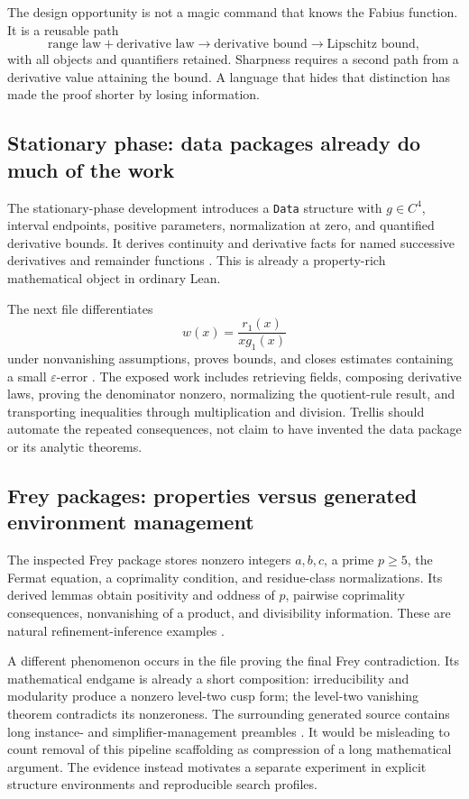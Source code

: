 \documentclass[11pt,a4paper]{article}
\theoremstyle{definition}
\theoremstyle{remark}
\newcommand{\code}[1]{\texttt{#1}}
\begin{document}
The design opportunity is not a magic command that knows the Fabius function. It is a reusable path
\[
 \text{range law} + \text{derivative law}
 \longrightarrow \text{derivative bound}
 \longrightarrow \text{Lipschitz bound},
\]
with all objects and quantifiers retained. Sharpness requires a second path from a derivative value attaining the bound. A language that hides that distinction has made the proof shorter by losing information.

\subsection{Stationary phase: data packages already do much of the work}
The stationary-phase development introduces a \code{Data} structure with $g\in C^4$, interval endpoints, positive parameters, normalization at zero, and quantified derivative bounds. It derives continuity and derivative facts for named successive derivatives and remainder functions \cite{spTaylor}. This is already a property-rich mathematical object in ordinary Lean.

The next file differentiates
\[
 w(x)=\frac{r_1(x)}{xg_1(x)}
\]
under nonvanishing assumptions, proves bounds, and closes estimates containing a small $\varepsilon$-error \cite{spParts}. The exposed work includes retrieving fields, composing derivative laws, proving the denominator nonzero, normalizing the quotient-rule result, and transporting inequalities through multiplication and division. Trellis should automate the repeated consequences, not claim to have invented the data package or its analytic theorems.

\subsection{Frey packages: properties versus generated environment management}
The inspected Frey package stores nonzero integers $a,b,c$, a prime $p\ge5$, the Fermat equation, a coprimality condition, and residue-class normalizations. Its derived lemmas obtain positivity and oddness of $p$, pairwise coprimality consequences, nonvanishing of a product, and divisibility information. These are natural refinement-inference examples \cite{freyDef}.

A different phenomenon occurs in the file proving the final Frey contradiction. Its mathematical endgame is already a short composition: irreducibility and modularity produce a nonzero level-two cusp form; the level-two vanishing theorem contradicts its nonzeroness. The surrounding generated source contains long instance- and simplifier-management preambles \cite{freyEnd}. It would be misleading to count removal of this pipeline scaffolding as compression of a long mathematical argument. The evidence instead motivates a separate experiment in explicit structure environments and reproducible search profiles.
\end{document}
